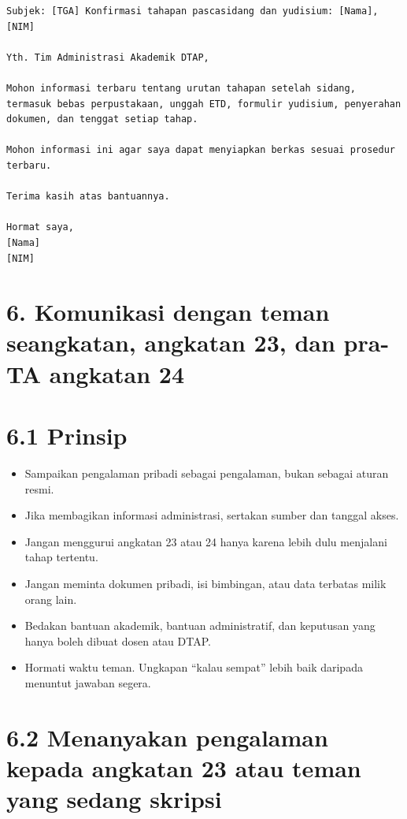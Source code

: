 \documentclass[
  indonesian,
]{article}
\providecommand{\tightlist}{%
  \setlength{\itemsep}{0pt}\setlength{\parskip}{0pt}}
\renewcommand{\subsection}{\section}
\begin{document}
\begin{verbatim}
Subjek: [TGA] Konfirmasi tahapan pascasidang dan yudisium: [Nama], [NIM]

Yth. Tim Administrasi Akademik DTAP,

Mohon informasi terbaru tentang urutan tahapan setelah sidang, termasuk bebas perpustakaan, unggah ETD, formulir yudisium, penyerahan dokumen, dan tenggat setiap tahap.

Mohon informasi ini agar saya dapat menyiapkan berkas sesuai prosedur terbaru.

Terima kasih atas bantuannya.

Hormat saya,
[Nama]
[NIM]
\end{verbatim}

\section{6. Komunikasi dengan teman seangkatan, angkatan 23, dan pra-TA
angkatan
24}\label{komunikasi-dengan-teman-seangkatan-angkatan-23-dan-pra-ta-angkatan-24}

\subsection{6.1 Prinsip}\label{prinsip}

\begin{itemize}
\tightlist
\item
  Sampaikan pengalaman pribadi sebagai pengalaman, bukan sebagai aturan
  resmi.
\item
  Jika membagikan informasi administrasi, sertakan sumber dan tanggal
  akses.
\item
  Jangan menggurui angkatan 23 atau 24 hanya karena lebih dulu menjalani
  tahap tertentu.
\item
  Jangan meminta dokumen pribadi, isi bimbingan, atau data terbatas
  milik orang lain.
\item
  Bedakan bantuan akademik, bantuan administratif, dan keputusan yang
  hanya boleh dibuat dosen atau DTAP.
\item
  Hormati waktu teman. Ungkapan ``kalau sempat'' lebih baik daripada
  menuntut jawaban segera.
\end{itemize}

\subsection{6.2 Menanyakan pengalaman kepada angkatan 23 atau teman yang
sedang
skripsi}\label{menanyakan-pengalaman-kepada-angkatan-23-atau-teman-yang-sedang-skripsi}
\end{document}
